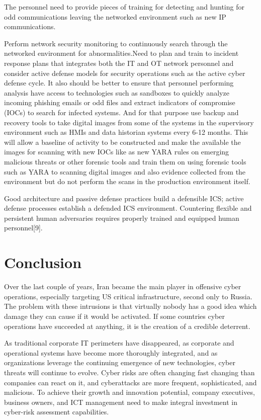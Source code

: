 \documentclass[conference]{IEEEtran}
\begin{document}
The personnel need to provide pieces of training for detecting and  hunting for odd communications leaving the networked environment such as new IP
communications.

Perform network security monitoring to continuously search through the networked environment for abnormalities.Need to plan and train to incident response plans that integrates both the IT and OT network personnel and consider active defense models for security operations such as the active cyber defense cycle. It also should be better to ensure that personnel performing analysis have access to technologies such as sandboxes to quickly analyze incoming phishing emails or odd files and extract indicators of compromise (IOCs) to search for infected systems. And for that purpose use backup and recovery tools to take digital images from some of the systems in the supervisory environment such as HMIs and data historian systems every 6-12 months. This will allow a baseline of activity to be constructed and make the available the images for scanning with new IOCs like as new YARA rules on emerging malicious threats or other forensic tools and train them on using forensic tools such as YARA to scanning digital images and also evidence collected from the environment but do not perform the scans in the production environment itself.

Good architecture and passive defense practices build a defensible ICS; active defense processes establish a defended ICS environment. Countering flexible and persistent human adversaries requires properly trained and equipped human personnel[9].




\section{Conclusion}
 Over the last couple of years, Iran became the main player in offensive cyber operations, especially targeting US critical infrastructure, second only to Russia. The problem with these intrusions is that virtually nobody has a good idea which damage they can cause if it would be activated. If some countries cyber operations have succeeded at anything, it is the creation of a credible deterrent.



As traditional corporate IT perimeters have disappeared, as corporate and operational systems have become more thoroughly integrated, and as organizations leverage the continuing emergence of new technologies, cyber threats will continue to evolve. Cyber risks are often changing fast changing than companies can react on it, and cyberattacks are more frequent, sophisticated, and malicious. To achieve their growth and innovation potential, company executives, business owners, and ICT management need to make integral investment in cyber-risk assessment capabilities. 
\end{document}
